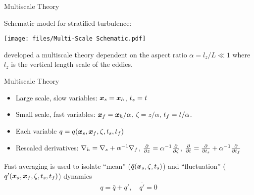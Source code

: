 \documentclass{beamer}
\begin{document}
\begin{frame}{Multiscale Theory \citep{Chinial2022}}

    Schematic model for stratified turbulence:
    \begin{center}
    \texttt{[image: files/Multi-Scale Schematic.pdf]}
    \end{center}
    \vspace{20pt}
    \citet{Chinial2022} developed a multiscale theory dependent on the aspect ratio $\alpha = l_z/L \ll 1$ where $l_z$ is the vertical length scale of the eddies. 

    
\end{frame}

\begin{frame}{Multiscale Theory \citep{Chinial2022}}

    \begin{itemize}
    \item Large scale, slow variables: $\boldsymbol{x}_s = \boldsymbol{x}_h$, $t_s = t$
    \item Small scale, fast variables: $\boldsymbol{x}_f = \boldsymbol{x}_h/\alpha$, $\zeta = z/\alpha$, $t_f = t/\alpha$.
    \item Each variable $q = q(\boldsymbol{x}_s, \boldsymbol{x}_f, \zeta, t_s, t_f)$
    \item Rescaled derivatives: $\nabla_h = \nabla_s + \alpha^{-1}\nabla_f$, $\frac{\partial }{\partial z} = \alpha^{-1}\frac{\partial }{\partial \zeta}$, $\frac{\partial }{\partial t} = \frac{\partial }{\partial t_s} + \alpha^{-1}\frac{\partial }{\partial t_f}$
    \end{itemize}
    \vspace{10pt}
    Fast averaging is used to isolate ``mean'' ($\bar{q}(\boldsymbol{x}_s, \zeta, t_s)$) and ``fluctuation'' ($q'(\boldsymbol{x}_s,\boldsymbol{x}_f,\zeta,t_s,t_f)$) dynamics
    \begin{gather*}
        q = \bar{q} + q', \quad \overline{q'} = 0
    \end{gather*}
\end{frame}
\end{document}
